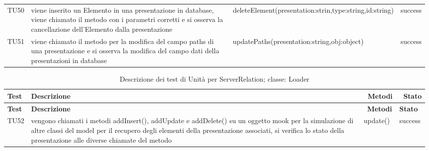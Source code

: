 \begin{longtable} [c]{| p{2cm} | p{6cm} |p{3cm} | p{2cm} |}
 		 TU50 & viene inserito un Elemento\ped{g} in una presentazione in database, viene chiamato il metodo con i parametri corretti e si osserva la cancellazione dell'Elemento\ped{g} dalla presentazione & deleteElement(presentation:strin,type:string,id:string) & success \\
 		 TU51 & viene chiamato il metodo per la modifica del campo paths di una presentazione e si osserva la modifica del campo dati della presentazioni in database & updatePaths(presentation:string,obj:object) & success \\
 		 \end{longtable}
  \begin{longtable} [c]{| p{2cm} | p{6cm} |p{3cm} | p{2cm} |}
		 	 						\caption{Descrizione dei test di Unità per ServerRelation; classe: Loader \label{tab:verTestUnit}}\\
	  		 \hline
	  		 \textbf{Test} & \textbf{Descrizione} & \ \textbf{Metodi} & \ \textbf{Stato} \\
	  		 \hline
	  		 \endfirsthead
	  		 \hline
	  		 \textbf{Test} & \textbf{Descrizione} & \ \textbf{Metodi} & \textbf{Stato} \\
	  		 \hline
		 	 						\endhead
	  		 \hline
	  		 \endfoot
	  		 \hline
	  		 \endlastfoot
 		 TU52 & vengono chiamati i metodi addInsert(), addUpdate e addDelete() su un oggetto mook per la simulazione di altre classi del model per il recupero degli elementi\ped{g} della presentazione associati, si verifica lo stato della presentazione alle diverse chiamate del metodo  & update() & success \\
 		 \end{longtable}
 		 
